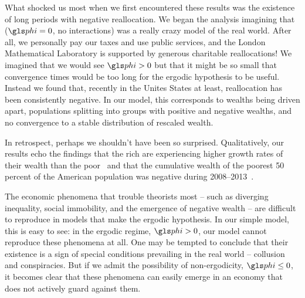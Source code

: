 What shocked us most when we first encountered these results was the existence of long periods with negative reallocation. We began the analysis imagining that \GBM (\ie $\gphi=0$, no interactions) was a really crazy model of the real world. After all, we personally pay our taxes and use public services, and the London Mathematical Laboratory is supported by generous charitable reallocations! We imagined that we would see $\gphi>0$ but that it might be so small that convergence times would be too long for the ergodic hypothesis to be useful. Instead we found that, recently in the Unites States at least, reallocation has been consistently negative. In our model, this corresponds to wealths being driven apart, populations splitting into groups with positive and negative wealths, and no convergence to a stable distribution of rescaled wealth.

In retrospect, perhaps we shouldn't have been so surprised. Qualitatively, our results echo the findings that the rich are experiencing higher growth rates of their wealth than the poor~\cite{Piketty2014,wolff2014household} and that the cumulative wealth of the poorest 50 percent of the American population was negative during 2008--2013~\cite{Rios20162013,WID2017}.

The economic phenomena that trouble theorists most -- such as diverging inequality, social immobility, and the emergence of negative wealth -- are difficult to reproduce in models that make the ergodic hypothesis. In our simple model, this is easy to see: in the ergodic regime, $\gphi>0$, our model cannot reproduce these phenomena at all. One may be tempted to conclude that their existence is a sign of special conditions prevailing in the real world -- collusion and conspiracies. But if we admit the possibility of non-ergodicity, $\gphi\leq0$, it becomes clear that these phenomena can easily emerge in an economy that does not actively guard against them.